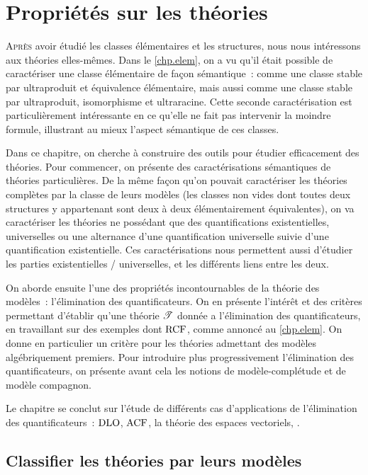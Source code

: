 \chapter{Propriétés sur les théories}
\label{chp.elim.quantif}

\minitoc

\lettrine{A}{près} avoir étudié les classes élémentaires et les structures, nous
nous intéressons aux théories elles-mêmes. Dans le \cref{chp.elem}, on a vu
qu'il était possible de caractériser une classe élémentaire de façon
sémantique~: comme une classe stable par ultraproduit et équivalence
élémentaire, mais aussi comme une classe stable par ultraproduit, isomorphisme
et ultraracine. Cette seconde caractérisation est particulièrement intéressante
en ce qu'elle ne fait pas intervenir la moindre formule, illustrant au mieux
l'aspect sémantique de ces classes.

Dans ce chapitre, on cherche à construire des outils pour étudier efficacement
des théories. Pour commencer, on présente des caractérisations sémantiques de
théories particulières. De la même façon qu'on pouvait caractériser les théories
complètes par la classe de leurs modèles (les classes non vides dont toutes
deux structures y appartenant sont deux à deux élémentairement équivalentes), on
va caractériser les théories ne possédant que des quantifications
existentielles, universelles ou une alternance d'une quantification universelle
suivie d'une quantification existentielle. Ces caractérisations nous permettent
aussi d'étudier les parties existentielles / universelles, et les différents
liens entre les deux.

On aborde ensuite l'une des propriétés incontournables de la théorie des
modèles~: l'élimination des quantificateurs. On en présente l'intérêt et des
critères permettant d'établir qu'une théorie $\mathscr T$ donnée a l'élimination des
quantificateurs, en travaillant sur des exemples dont $\operatorname{RCF}$, comme annoncé au
\cref{chp.elem}. On donne en particulier un critère pour les théories admettant
des modèles algébriquement premiers. Pour introduire plus progressivement
l'élimination des quantificateurs, on présente avant cela les notions de
modèle-complétude et de modèle compagnon.

Le chapitre se conclut sur l'étude de différents cas d'applications de
l'élimination des quantificateurs~: $\operatorname{DLO}$, $\operatorname{ACF}$, la théorie des
espaces vectoriels, .

\section{Classifier les théories par leurs modèles}

